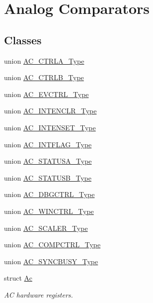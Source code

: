 \hypertarget{group___s_a_m_l21___a_c}{}\section{Analog Comparators}
\label{group___s_a_m_l21___a_c}
\subsection*{Classes}
\begin{DoxyCompactItemize}
\item 
union \hyperlink{union_a_c___c_t_r_l_a___type}{A\+C\+\_\+\+C\+T\+R\+L\+A\+\_\+\+Type}
\item 
union \hyperlink{union_a_c___c_t_r_l_b___type}{A\+C\+\_\+\+C\+T\+R\+L\+B\+\_\+\+Type}
\item 
union \hyperlink{union_a_c___e_v_c_t_r_l___type}{A\+C\+\_\+\+E\+V\+C\+T\+R\+L\+\_\+\+Type}
\item 
union \hyperlink{union_a_c___i_n_t_e_n_c_l_r___type}{A\+C\+\_\+\+I\+N\+T\+E\+N\+C\+L\+R\+\_\+\+Type}
\item 
union \hyperlink{union_a_c___i_n_t_e_n_s_e_t___type}{A\+C\+\_\+\+I\+N\+T\+E\+N\+S\+E\+T\+\_\+\+Type}
\item 
union \hyperlink{union_a_c___i_n_t_f_l_a_g___type}{A\+C\+\_\+\+I\+N\+T\+F\+L\+A\+G\+\_\+\+Type}
\item 
union \hyperlink{union_a_c___s_t_a_t_u_s_a___type}{A\+C\+\_\+\+S\+T\+A\+T\+U\+S\+A\+\_\+\+Type}
\item 
union \hyperlink{union_a_c___s_t_a_t_u_s_b___type}{A\+C\+\_\+\+S\+T\+A\+T\+U\+S\+B\+\_\+\+Type}
\item 
union \hyperlink{union_a_c___d_b_g_c_t_r_l___type}{A\+C\+\_\+\+D\+B\+G\+C\+T\+R\+L\+\_\+\+Type}
\item 
union \hyperlink{union_a_c___w_i_n_c_t_r_l___type}{A\+C\+\_\+\+W\+I\+N\+C\+T\+R\+L\+\_\+\+Type}
\item 
union \hyperlink{union_a_c___s_c_a_l_e_r___type}{A\+C\+\_\+\+S\+C\+A\+L\+E\+R\+\_\+\+Type}
\item 
union \hyperlink{union_a_c___c_o_m_p_c_t_r_l___type}{A\+C\+\_\+\+C\+O\+M\+P\+C\+T\+R\+L\+\_\+\+Type}
\item 
union \hyperlink{union_a_c___s_y_n_c_b_u_s_y___type}{A\+C\+\_\+\+S\+Y\+N\+C\+B\+U\+S\+Y\+\_\+\+Type}
\item 
struct \hyperlink{struct_ac}{Ac}
\begin{DoxyCompactList}\small\item\em A\+C hardware registers. \end{DoxyCompactList}\end{DoxyCompactItemize}
